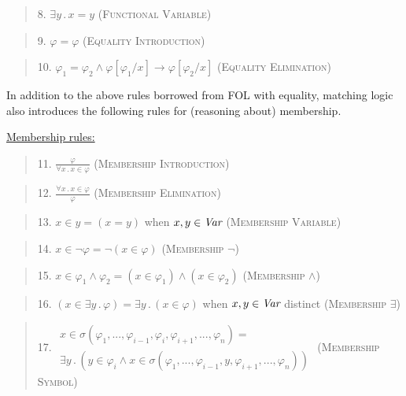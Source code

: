 \documentclass[UTF8,11pt]{article}
\theoremstyle{plain}
\theoremstyle{definition}
\theoremstyle{remark}
\newcommand{\ra}{\rightarrow}
\begin{document}
\begin{quote}
8. $\exists y\,.\,x=y$
\hfill \textsc{(Functional Variable)}
\end{quote}

\begin{quote}
9. $\varphi = \varphi$
\hfill \textsc{(Equality Introduction)}
\end{quote}

\begin{quote}
10. $\varphi_1=\varphi_2 \mathrel\wedge \varphi[\varphi_1/x] \ra \varphi[\varphi_2/x]$
\hfill \textsc{(Equality Elimination)}
\end{quote}

In addition to the above rules borrowed from FOL with equality, matching
logic also introduces the following rules for (reasoning about) membership.

\vspace*{2ex}

\noindent
\underline{Membership rules:}

\begin{quote}
11. $\displaystyle\frac{\varphi}{\forall x\,.\,x\in\varphi}$
\hfill \textsc{(Membership Introduction)}
\end{quote}

\begin{quote}
12. $\displaystyle\frac{\forall x\,.\,x\in\varphi}{\varphi}$
\hfill \textsc{(Membership Elimination)}
\end{quote}

\begin{quote}
13. $x \in y = (x=y)$ when $x,y\in\textit{Var}$
\hfill \textsc{(Membership Variable)}
\end{quote}

\begin{quote}
14. $x\in\neg\varphi = \neg(x\in\varphi)$
\hfill \textsc{(Membership $\neg$)}
\end{quote}

\begin{quote}
15. $x\in\varphi_1\wedge\varphi_2 = (x\in\varphi_1) \wedge (x\in\varphi_2)$
\hfill \textsc{(Membership $\wedge$)}
\end{quote}

\begin{quote}
16. $(x\in\exists y\,.\,\varphi) = \exists y\,.\,(x\in\varphi)$ when $x,y\in\textit{Var}$ distinct
\hfill \textsc{(Membership $\exists$)}
\end{quote}

\begin{quote}
17. $\begin{array}{l}x\in\sigma(\varphi_1,...,\varphi_{i-1},\varphi_i,\varphi_{i+1},...,\varphi_n) = \\ \exists y\,.\, (y \in\varphi_i \mathrel\wedge x \in\sigma(\varphi_1,...,\varphi_{i-1},y,\varphi_{i+1},...,\varphi_n))\end{array}$
\hfill \textsc{(Membership Symbol)}
\end{quote}
\end{document}

